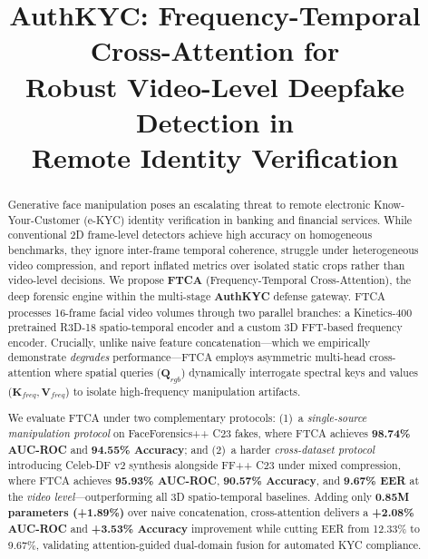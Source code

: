 \documentclass[conference,10pt]{IEEEtran}
\begin{document}
\title{AuthKYC: Frequency-Temporal Cross-Attention for\\Robust Video-Level Deepfake Detection in\\Remote Identity Verification}

\author{
}

\maketitle

\begin{abstract}
Generative face manipulation poses an escalating threat to remote electronic Know-Your-Customer (e-KYC) identity verification in banking and financial services. While conventional 2D frame-level detectors achieve high accuracy on homogeneous benchmarks, they ignore inter-frame temporal coherence, struggle under heterogeneous video compression, and report inflated metrics over isolated static crops rather than video-level decisions. We propose \textbf{FTCA} (Frequency-Temporal Cross-Attention), the deep forensic engine within the multi-stage \textbf{AuthKYC} defense gateway. FTCA processes 16-frame facial video volumes through two parallel branches: a Kinetics-400 pretrained R3D-18 spatio-temporal encoder and a custom 3D FFT-based frequency encoder. Crucially, unlike naive feature concatenation---which we empirically demonstrate \textit{degrades} performance---FTCA employs asymmetric multi-head cross-attention where spatial queries ($\mathbf{Q}_{rgb}$) dynamically interrogate spectral keys and values ($\mathbf{K}_{freq}, \mathbf{V}_{freq}$) to isolate high-frequency manipulation artifacts.

We evaluate FTCA under two complementary protocols: (1)~a \textit{single-source manipulation protocol} on FaceForensics++ C23 fakes, where FTCA achieves \textbf{98.74\% AUC-ROC} and \textbf{94.55\% Accuracy}; and (2)~a harder \textit{cross-dataset protocol} introducing Celeb-DF v2 synthesis alongside FF++ C23 under mixed compression, where FTCA achieves \textbf{95.93\% AUC-ROC}, \textbf{90.57\% Accuracy}, and \textbf{9.67\% EER} at the \textit{video level}---outperforming all 3D spatio-temporal baselines. Adding only \textbf{0.85M parameters (+1.89\%)} over naive concatenation, cross-attention delivers a \textbf{+2.08\% AUC-ROC} and \textbf{+3.53\% Accuracy} improvement while cutting EER from 12.33\% to 9.67\%, validating attention-guided dual-domain fusion for automated KYC compliance.
\end{abstract}
\end{document}
